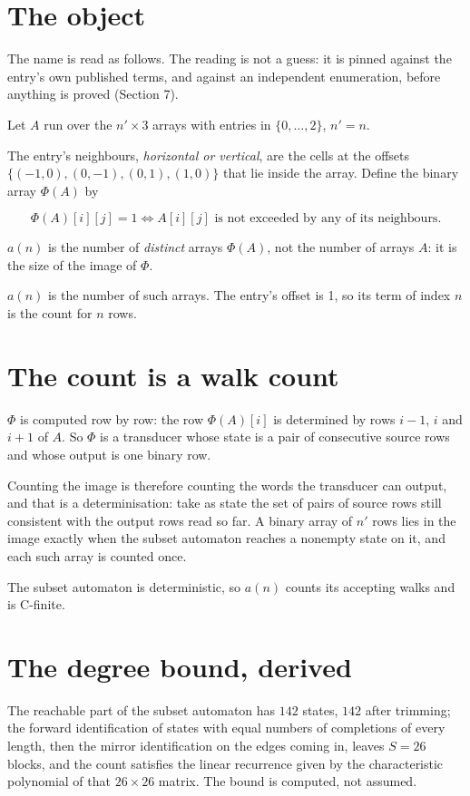 \documentclass[11pt]{article}
\theoremstyle{definition}
\begin{document}
\section{The object}

The name is read as follows. The reading is not a guess: it is pinned against the entry's own published terms, and against an independent enumeration, before anything is proved (Section 7).

Let $A$ run over the $n' \times 3$ arrays with entries in $\{0,\dots,2\}$, $n' = n$.

The entry's neighbours, {\itshape horizontal or vertical}, are the cells at the offsets $\{(-1,0), (0,-1), (0,1), (1,0)\}$ that lie inside the array. Define the binary array $\Phi(A)$ by

\[\Phi(A)[i][j] = 1 \iff A[i][j] \text{ is not exceeded by any of its neighbours}.\]

$a(n)$ is the number of {\itshape distinct} arrays $\Phi(A)$, not the number of arrays $A$: it is the size of the image of $\Phi$.

$a(n)$ is the number of such arrays. The entry's offset is 1, so its term of index $n$ is the count for $n$ rows.

\section{The count is a walk count}

$\Phi$ is computed row by row: the row $\Phi(A)[i]$ is determined by rows $i-1$, $i$ and $i+1$ of $A$. So $\Phi$ is a transducer whose state is a pair of consecutive source rows and whose output is one binary row.

Counting the image is therefore counting the words the transducer can output, and that is a determinisation: take as state the set of pairs of source rows still consistent with the output rows read so far. A binary array of $n'$ rows lies in the image exactly when the subset automaton reaches a nonempty state on it, and each such array is counted once.

The subset automaton is deterministic, so $a(n)$ counts its accepting walks and is C-finite.

\section{The degree bound, derived}

The reachable part of the subset automaton has $142$ states, $142$ after trimming; the forward identification of states with equal numbers of completions of every length, then the mirror identification on the edges coming in, leaves $S = 26$ blocks, and the count satisfies the linear recurrence given by the characteristic polynomial of that $26\times26$ matrix. The bound is computed, not assumed.
\end{document}
